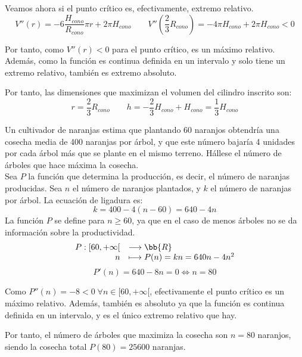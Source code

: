 \begin{ejercicio}
    Veamos ahora si el punto crítico es, efectivamente, extremo relativo.
    \begin{equation*}
        V''(r) = -6\frac{H_{cono}}{R_{cono}}\pi r + 2\pi H_{cono} \qquad
        V''\left(\frac{2}{3}R_{cono}\right) = -4\pi H_{cono} + 2\pi H_{cono} < 0
    \end{equation*}

    Por tanto, como $V''(r) <0$ para el punto crítico, es un máximo relativo. Además, como la función es continua definida en un intervalo y solo tiene un extremo relativo, también es extremo absoluto.

    Por tanto, las dimensiones que maximizan el volumen del cilindro inscrito son:
    \begin{equation*}
        r=\frac{2}{3} R_{cono} \qquad h=-\frac{2}{3}H_{cono} + H_{cono} = \frac{1}{3}H_{cono}
    \end{equation*}
    
\end{ejercicio}

\begin{ejercicio}
    Un cultivador de naranjas estima que plantando 60 naranjos obtendría una cosecha media de 400 naranjas por árbol, y que este número bajaría 4 unidades por cada árbol más que se plante en el mismo terreno. Hállese el número de árboles que hace máxima la cosecha.\\

    Sea $P$ la función que determina la producción, es decir, el número de naranjas producidas. Sea $n$ el número de naranjos plantados, y $k$ el número de naranjas por árbol. La ecuación de ligadura es:
    $$k = 400 - 4(n-60) = 640 - 4n$$
    La función $P$ se define para $n\geq 60$, ya que en el caso de menos árboles no se da información sobre la productividad.
    \begin{equation*}
        \begin{array}{rl}
            P:[60, +\infty[ & \longrightarrow \bb{R}\\
                    n & \longmapsto P(n)=kn = 640n -4n^2
        \end{array}
    \end{equation*}
    \begin{equation*}
        P'(n) = 640 - 8n = 0\Longleftrightarrow n=80
    \end{equation*}

    Como $P''(n)=-8<0 \; \forall n\in [60, +\infty[$, efectivamente el punto crítico es un máximo relativo. Además, también es absoluto ya que la función es continua definida en un intervalo, y es el único extremo relativo que hay.

    Por tanto, el número de árboles que maximiza la cosecha son $n=80$ naranjos, siendo la cosecha total $P(80)=25600$ naranjas.
\end{ejercicio}

